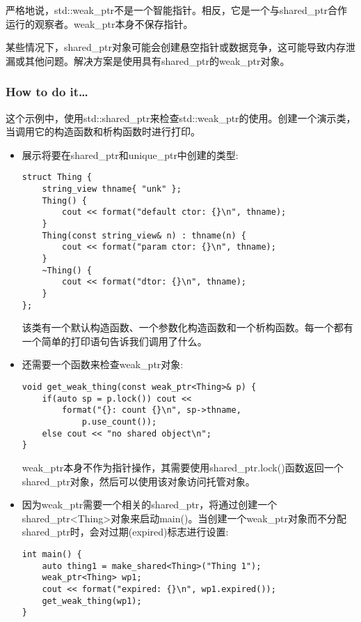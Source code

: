 
严格地说，std::weak\_ptr不是一个智能指针。相反，它是一个与shared\_ptr合作运行的观察者。weak\_ptr本身不保存指针。

某些情况下，shared\_ptr对象可能会创建悬空指针或数据竞争，这可能导致内存泄漏或其他问题。解决方案是使用具有shared\_ptr的weak\_ptr对象。

\subsubsection{How to do it…}

这个示例中，使用std::shared\_ptr来检查std::weak\_ptr的使用。创建一个演示类，当调用它的构造函数和析构函数时进行打印。

\begin{itemize}
\item 
展示将要在shared\_ptr和unique\_ptr中创建的类型:

\begin{lstlisting}[style=styleCXX]
struct Thing {
	string_view thname{ "unk" };
	Thing() {
		cout << format("default ctor: {}\n", thname);
	}
	Thing(const string_view& n) : thname(n) {
		cout << format("param ctor: {}\n", thname);
	}
	~Thing() {
		cout << format("dtor: {}\n", thname);
	}
};
\end{lstlisting}

该类有一个默认构造函数、一个参数化构造函数和一个析构函数。每一个都有一个简单的打印语句告诉我们调用了什么。

\item 
还需要一个函数来检查weak\_ptr对象:

\begin{lstlisting}[style=styleCXX]
void get_weak_thing(const weak_ptr<Thing>& p) {
	if(auto sp = p.lock()) cout <<
		format("{}: count {}\n", sp->thname,
			p.use_count());
	else cout << "no shared object\n";
}
\end{lstlisting}

weak\_ptr本身不作为指针操作，其需要使用shared\_ptr.lock()函数返回一个shared\_ptr对象，然后可以使用该对象访问托管对象。

\item 
因为weak\_ptr需要一个相关的shared\_ptr，将通过创建一个shared\_ptr<Thing>对象来启动main()。当创建一个weak\_ptr对象而不分配shared\_ptr时，会对过期(expired)标志进行设置:

\begin{lstlisting}[style=styleCXX]
int main() {
	auto thing1 = make_shared<Thing>("Thing 1");
	weak_ptr<Thing> wp1;
	cout << format("expired: {}\n", wp1.expired());
	get_weak_thing(wp1);
}
\end{lstlisting}


\end{itemize}
